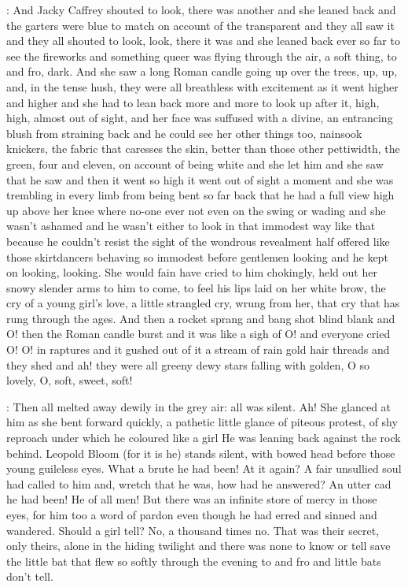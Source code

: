 :
And Jacky Caffrey shouted to look, there was another and she leaned back
and the garters were blue to match on account of the transparent and they
all saw it and they all shouted to look, look, there it was and she leaned
back ever so far to see the fireworks and something queer was flying
through the air, a soft thing, to and fro, dark. And she saw a long Roman
candle going up over the trees, up, up, and, in the tense hush,
they were all breathless with excitement as it went higher and higher
and she had to lean back more and more to look up after it, high,
high, almost out of sight, and her face was suffused with a divine,
an entrancing blush from straining back and he could see her other
things too, nainsook knickers, the fabric that caresses the skin,
better than those other pettiwidth, the green, four and eleven,
on account of being white and she let him and she saw that he saw and then
it went so high it went out of sight a moment and she was trembling in
every limb from being bent so far back that he had a full view
high up above her knee where no-one ever not even on the swing or wading
and she wasn't ashamed and he wasn't either to look in that immodest way
like that because he couldn't resist the sight of the wondrous revealment
half offered like those skirtdancers behaving so immodest before gentlemen
looking and he kept on looking, looking. She would fain have cried to him
chokingly, held out her snowy slender arms to him to come, to feel his
lips laid on her white brow, the cry of a young girl's love, a little
strangled cry, wrung from her, that cry that has rung through the ages.
And then a rocket sprang and bang shot blind blank and O! then the Roman
candle burst and it was like a sigh of O! and everyone cried O! O! in
raptures and it gushed out of it a stream of rain gold hair threads and
they shed and ah! they were all greeny dewy stars falling with golden,
O so lovely, O, soft, sweet, soft!

:
Then all melted away dewily in the grey air: all was silent. Ah! She
glanced at him as she bent forward quickly, a pathetic little glance of
piteous protest, of shy reproach under which he coloured like a girl
He was leaning back against the rock behind. Leopold Bloom (for it is he)
stands silent, with bowed head before those young guileless eyes. What a
brute he had been! At it again? A fair unsullied soul had called to him
and, wretch that he was, how had he answered? An utter cad he had been!
He of all men! But there was an infinite store of mercy in those eyes,
for him too a word of pardon even though he had erred and sinned and
wandered. Should a girl tell? No, a thousand times no. That was their
secret, only theirs, alone in the hiding twilight and there was none to
know or tell save the little bat that flew so softly through the evening
to and fro and little bats don't tell.

